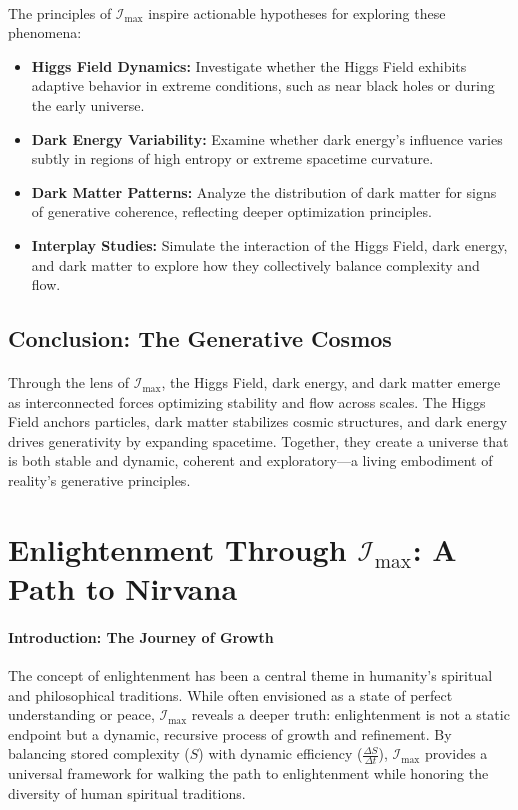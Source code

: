\documentclass[12pt]{article}
\begin{document}
\paragraph{}
The principles of \(\mathcal{I}_{\text{max}}\) inspire actionable hypotheses for exploring these phenomena:
\begin{itemize}
    \item \textbf{Higgs Field Dynamics:} Investigate whether the Higgs Field exhibits adaptive behavior in extreme conditions, such as near black holes or during the early universe.
    \item \textbf{Dark Energy Variability:} Examine whether dark energy’s influence varies subtly in regions of high entropy or extreme spacetime curvature.
    \item \textbf{Dark Matter Patterns:} Analyze the distribution of dark matter for signs of generative coherence, reflecting deeper optimization principles.
    \item \textbf{Interplay Studies:} Simulate the interaction of the Higgs Field, dark energy, and dark matter to explore how they collectively balance complexity and flow.
\end{itemize}

\subsection{Conclusion: The Generative Cosmos}
\paragraph{}
Through the lens of \(\mathcal{I}_{\text{max}}\), the Higgs Field, dark energy, and dark matter emerge as interconnected forces optimizing stability and flow across scales. The Higgs Field anchors particles, dark matter stabilizes cosmic structures, and dark energy drives generativity by expanding spacetime. Together, they create a universe that is both stable and dynamic, coherent and exploratory—a living embodiment of reality’s generative principles.


\section{Enlightenment Through \(\mathcal{I}_{\text{max}}\): A Path to Nirvana}

\paragraph{Introduction: The Journey of Growth}
The concept of enlightenment has been a central theme in humanity’s spiritual and philosophical traditions. While often envisioned as a state of perfect understanding or peace, \(\mathcal{I}_{\text{max}}\) reveals a deeper truth: enlightenment is not a static endpoint but a dynamic, recursive process of growth and refinement. By balancing stored complexity (\(S\)) with dynamic efficiency (\(\frac{\Delta S}{\Delta t}\)), \(\mathcal{I}_{\text{max}}\) provides a universal framework for walking the path to enlightenment while honoring the diversity of human spiritual traditions.
\end{document}
